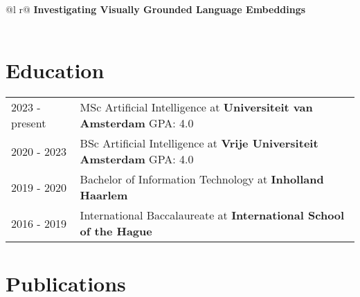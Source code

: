 \documentclass[a4paper,12pt]{article}
\begin{document}
\begin{tabularx}{\linewidth}{ @{}l r@{} }
\textbf{Investigating Visually Grounded Language Embeddings}\\%
\\
\end{tabularx}

\section{Education}
\begin{tabularx}{\linewidth}{@{}l X@{}}	
2023 - present & MSc Artificial Intelligence at \textbf{Universiteit van Amsterdam} \hfill \normalsize GPA: 4.0 \\

2020 - 2023 & BSc Artificial Intelligence at \textbf{Vrije Universiteit Amsterdam} \hfill GPA: 4.0 \\ 

2019 - 2020 & Bachelor of Information Technology at \textbf{Inholland Haarlem}\hfill  \\

2016 - 2019 & International Baccalaureate at \textbf{International School of the Hague} \hfill  \\
\end{tabularx}

\section{Publications}
\begin{refsection}
\nocite{*}
\printbibliography[heading=none]
\end{refsection}

\end{document}
